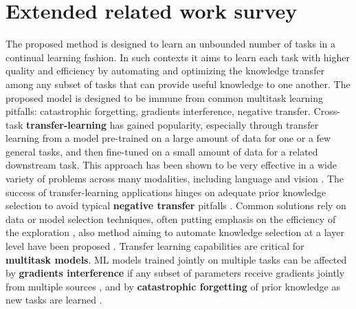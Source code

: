 \documentclass{article} \usepackage{iclr2023_conference,times}
\begin{document}
\clearpage





















\clearpage
\appendix

\section{Extended related work survey}
\label{sec:ex-rel}

The proposed method is designed to learn an unbounded number of tasks in a continual learning fashion.
In such contexts it aims to learn each task with higher quality and efficiency by automating and optimizing the knowledge transfer among any subset of tasks that can provide useful knowledge to one another.
The proposed model is designed to be immune from common multitask learning pitfalls: catastrophic forgetting, gradients interference, negative transfer. 
Cross-task \textbf{transfer-learning}
has gained popularity, especially through transfer learning from a model
pre-trained on a large amount of data for one or a few general tasks,
and then fine-tuned on a small amount of data for a related downstream task.
This approach has been shown to be very effective in a wide variety of problems
across many modalities, including
language \citep{Devlin2019BERTPO,Raffel2020ExploringTL} and vision \citep{Dosovitskiy2021AnII,He2016DeepRL}.
The success of transfer-learning applications hinges on adequate prior knowledge selection to avoid typical \textbf{negative transfer} pitfalls \citep{Rosenstein2005ToTO,Wang2019CharacterizingAA}.
Common solutions rely on data or model selection techniques,
often putting emphasis on the efficiency of the exploration
\citep{Zhang2020ASO,Mensink2021FactorsOI}, also method aiming to automate knowledge selection at a layer level have been proposed \citet{Sun2020AdaShareLW}.
Transfer learning capabilities are critical for \textbf{multitask models}.
ML models trained jointly on multiple tasks 
can be affected by \textbf{gradients interference} if any subset of parameters receive gradients jointly from multiple sources \citep{Chen2018GradNormGN,Yu2020GradientSF}, and by \textbf{catastrophic forgetting} of prior knowledge as new tasks are learned \citep{McCloskey1989CatastrophicII,French1999CatastrophicFI}.
\end{document}

